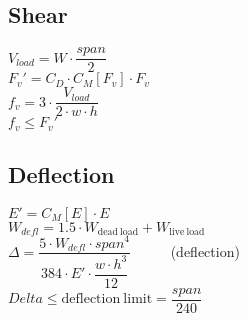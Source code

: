 \documentclass[12pt]{article}
\begin{document}
\subsection{Shear}

$V_{load} = W \cdot \dfrac{span}{2}$ \\[0.5ex]
$F_v' = C_D \cdot C_M[F_v] \cdot F_v$ \\[0.5ex]
$f_v = 3 \cdot \dfrac{V_{load}}{2 \cdot w \cdot h}$ \\[0.5ex]
$f_v \leq F_v'$

\newpage

\subsection{Deflection}

$E' = C_M[E] \cdot E$
\\[1.0ex]
$W_{defl} = 1.5 \cdot W_{\mathrm{dead~load}} + W_{\mathrm{live~load}}$
\\[1.0ex]
$\Delta = \dfrac{5 \cdot W_{defl} \cdot span^4}
                {384 \cdot E' \cdot \dfrac{w \cdot h^3}{12}}$
		~~~~~(deflection)
\\[1.0ex]
$Delta \leq {\mathrm{deflection~limit}} = \dfrac{span}{240}$
\end{document}
